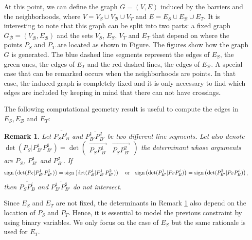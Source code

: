\documentclass[a4paper]{elsarticle}
\newcommand{\B}{{\mathcal B}}
\newcommand{\VB}{{V^{}_{\mathcal B}}}
\newcommand{\EB}{{E^{}_{\mathcal B}}}
\newcommand{\VS}{{V^{}_{S}}}
\newcommand{\ES}{{E^{}_{S}}}
\newcommand{\VT}{{V^{}_{T}}}
\newcommand{\ET}{{E^{}_{T}}}
\newtheorem{remark}{Remark}
\begin{document}
At this point, we can define the graph $G= (V, E)$ induced by the barriers and the neighborhoods, where $V=\VS\cup \VB\cup\VT$ and $E=\ES\cup\EB \cup\ET$. It is interesting to note that this graph can be split into two parts: a fixed graph $G_\B=(\VB,\EB)$ and the sets $\VS$, $\ES$, $\VT$ and $\ET$ that depend on where the points $P_S$ and $P^{}_T$ are located as shown in Figure.  The figures show how the graph $G$ is generated. The blue dashed line segments represent the edges of $\ES$, the green ones, the edges of $\ET$ and the red dashed lines, the edges of $\EB$. A special case that can be remarked occurs when the neighborhoods are points. In that case, the induced graph is completely fixed and it is only necessary to find which edges are included by keeping in mind that there can not have crossings.


%

The following computational geometry result is useful to compute the edges in $\ES,\EB$ and $\ET$:

\newcommand{\determinant}[3]{\det({#1|#2#3})}




\begin{remark}\label{rem:determinants}
Let $\overline{P_SP_B^i}$ and $\overline{P_{B'}^1P_{B'}^2}$ be two different line segments. Let also denote $\determinant{P_S}{P_{B'}^1}{P_{B'}^2}=\det\left(\begin{array}{c|c} \overrightarrow{P^{}_SP_{B'}^1} & \overrightarrow{P^{}_SP_{B'}^2}\end{array}\right)$ the determinant whose arguments are $P^{}_S$, $P_{B'}^1$ and $P_{B'}^2$. If
\begin{equation*}
\normalfont{\text{sign}}\left(\determinant{P_S}{P_{B'}^1}{P_{B'}^2}\right) = \normalfont{\text{sign}}\left(\determinant{P_B^i}{P_{B'}^1}{P_{B'}^2}\right)
\quad
\text{or}
\quad
\normalfont{\text{sign}}\left(\determinant{P_{B'}^1}{P_S}{P_B^i}\right) = \normalfont{\text{sign}}\left(\determinant{P_{B'}^2}{P_S}{P_B^i}\right)
,
\end{equation*}
then $\overline{P_SP_B^i}$ and $\overline{P_{B'}^1P_{B'}^2}$ do not intersect.
\end{remark}

\newcommand{\segment}[2]{\overline{#1#2}}

Since $\ES$ and $\ET$ are not fixed, the determinants in Remark \ref{rem:determinants} also depend on the location of $P_S$ and $P^{}_T$.  Hence, it is essential to model the previous constraint by using binary variables. We only focus on the case of $E_S$ but the same rationale is used for $E_T$.
\end{document}
